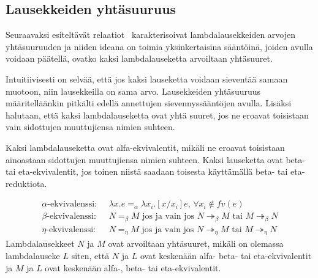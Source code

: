 %

\subsection{Lausekkeiden yhtäsuuruus}

Seuraavaksi esiteltävät relaatiot~\cite[s.~23--24]{HBEB2000} karakterisoivat lambdalausekkeiden arvojen yhtäsuuruuden ja niiden ideana on toimia yksinkertaisina sääntöinä, joiden avulla voidaan päätellä, ovatko kaksi lambdalauseketta arvoiltaan yhtäsuuret.
\par
Intuitiivisesti on selvää, että jos kaksi lauseketta voidaan sieventää samaan muotoon, niin lausekkeilla on sama arvo. Lausekkeiden yhtäsuuruus määritelläänkin pitkälti edellä annettujen sievennyssääntöjen avulla. Lisäksi halutaan, että kaksi lambdalauseketta ovat yhtä suuret, jos ne eroavat toisistaan vain sidottujen muuttujiensa nimien suhteen.  
\par
Kaksi lambdalauseketta ovat alfa-ekvivalentit, mikäli ne eroavat toisistaan ainoastaan sidottujen muuttujiensa nimien suhteen. Kaksi lauseketta ovat beta- tai eta-ekvivalentit, jos toinen niistä saadaan toisesta käyttämällä beta- tai eta-reduktiota.

\begin{maar}
		 
\begin{align*}
\alpha \text{-ekvivalenssi: }& \; \lambda x.e =_{\alpha} \lambda x_{i}.		[x/x_{i}]e \text{,  } \forall x_{i} \notin fv(e) \\ 
\beta \text{-ekvivalenssi: }& \; N =_{\beta} M \text{ jos ja vain jos } N 		\twoheadrightarrow_{\beta} M \text{ tai } M \twoheadrightarrow_{\beta} N \\
\eta \text{-ekvivalenssi: }& \; N =_{\eta} M \text{ jos ja vain jos } N 		\twoheadrightarrow_{\eta} M \text{ tai } M \twoheadrightarrow_{\eta} N 
\end{align*}
Lambdalausekkeet $N$ ja $M$ ovat arvoiltaan yhtäsuuret, mikäli	on olemassa lambdalauseke $L$ siten, että $N$ ja $L$ ovat keskenään alfa- beta- tai eta-ekvivalentit ja $M$ ja $L$ ovat keskenään alfa-, beta- tai eta-ekvivalentit.	
\end{maar}

